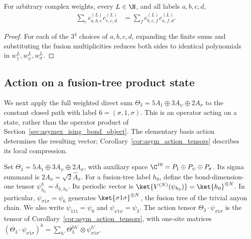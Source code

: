 \begin{lemma}
    \label{thm:asymex_ising_assoc}
    \leanok
    For arbitrary complex weights, every $L\in\N$, and all labels
    $a,b,c,d$,
    \begin{align}
        \sum_e c_{a,b,e}^{(L)}c_{e,c,d}^{(L)}
         & =\sum_f c_{b,c,f}^{(L)}c_{a,f,d}^{(L)}.
    \end{align}
\end{lemma}
\begin{proof}
    \leanok
    For each of the $3^4$ choices of $a,b,c,d$, expanding the finite sums
    and substituting the fusion multiplicities reduces both sides to
    identical polynomials in $w_1^L,w_\psi^L,w_\sigma^L$.
\end{proof}

\subsection{Action on a fusion-tree product state}%
\label{sec:asymex_ising_action}

We next apply the full weighted direct sum
$\Theta_3=5A_1\oplus3A_\psi\oplus2A_\sigma$ to the constant closed path
with label $6=(\sigma,1,\sigma)$. This is an operator acting on a
state, rather than the operator product of
Section~\ref{sec:asymex_ising_bond_object}.
The elementary basis action determines the resulting vector;
Corollary~\ref{cor:asym_action_tensors} describes its local compression.

\begin{definition}%
    \label{def:asymex_ising_action}
    \leanok
    Set $\Theta_3=5A_1\oplus3A_\psi\oplus2A_\sigma$, with auxiliary space
    $\C^{10}=P_1\oplus P_\psi\oplus P_\sigma$.
    Its sigma summand is $2A_\sigma=\sqrt2\widehat A_\sigma$.
    For a fusion-tree label $h_0$, define the bond-dimension-one tensor
    $\psi_{h_0}^h=\delta_{h,h_0}$. Its periodic vector is
    $\ket{V^{(N)}(\psi_{h_0})}=\ket{h_0}^{\otimes N}$.
    In particular, $\psi_{\sigma1\sigma}=\psi_6$ generates
    $\ket{\sigma1\sigma}^{\otimes N}$, the fusion tree of the trivial
    anyon chain. We also write $\psi_{111}=\psi_0$ and
    $\psi_{\psi1\psi}=\psi_3$.
    The action tensor $\Theta_3\cdot\psi_{\sigma1\sigma}$ is the tensor
    of Corollary~\ref{cor:asym_action_tensors}, with one-site matrices
    $(\Theta_3\cdot\psi_{\sigma1\sigma})^h
        =\sum_{h'}\Theta_3^{hh'}\otimes\psi_{\sigma1\sigma}^{h'}$.
\end{definition}

